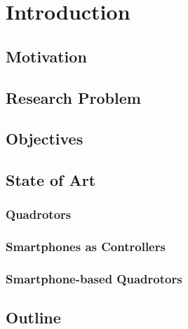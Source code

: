 \chapter{Introduction} \label{ch:introduction}
\section{Motivation}

\section{Research Problem}

\section{Objectives}


\section{State of Art}


\subsection{Quadrotors}

\subsection{Smartphones as Controllers}


\subsection{Smartphone-based Quadrotors}



\section{Outline}


